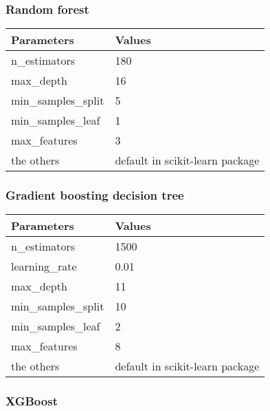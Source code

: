 \documentclass[review]{elsarticle}
\begin{document}
\subsubsection{Random forest}

\begin{table}[H]
    \begin{tabular}{|m{9em}|m{14em}|}
    \hline
    \textbf{Parameters} & \textbf{Values} \\ \hline
    n\_estimators & 180 \\ \hline
    max\_depth & 16 \\ \hline
    min\_samples\_split & 5 \\ \hline
    min\_samples\_leaf & 1 \\ \hline
    max\_features & 3 \\ \hline
    the others & default in scikit-learn package \\ \hline
    \end{tabular}
\end{table}

\subsubsection{Gradient boosting decision tree}

\begin{table}[H]
    \begin{tabular}{|m{9em}|m{14em}|}
    \hline
    \textbf{Parameters} & \textbf{Values} \\ \hline
    n\_estimators & 1500 \\ \hline
    learning\_rate & 0.01 \\ \hline
    max\_depth & 11 \\ \hline
    min\_samples\_split & 10 \\ \hline
    min\_samples\_leaf & 2 \\ \hline
    max\_features & 8 \\ \hline
    the others & default in scikit-learn package \\ \hline
    \end{tabular}
\end{table}

\subsubsection{XGBoost}
\end{document}
